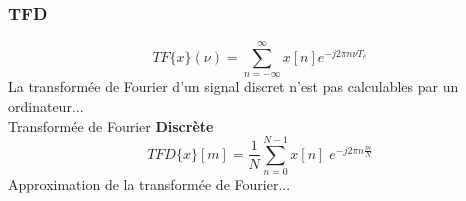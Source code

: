 \documentclass{beamer}
\begin{document}
\begin{frame}
\begin{columns}
\begin{center}
\end{center}
\end{columns}

\end{frame}

\begin{frame}
\frametitle{TFD}
\[TF\{ x \}(\nu) = \sum_{n = -\infty}^{\infty} x[n] e^{-j 2 \pi n \nu T_e} \]
La transformée de Fourier d'un signal discret n'est pas calculables par un ordinateur...\\
\vspace{0.6cm}
Transformée de Fourier \textbf{Discrète}
\[ TFD\{ x \}[m] = \frac{1}{N} \sum_{n = 0}^{N-1} x[n] \; e^{-j 2 \pi n \frac{m}{N}}  \] 
\vspace{0.3cm}
Approximation de la transformée de Fourier...
\end{frame}
\end{document}
